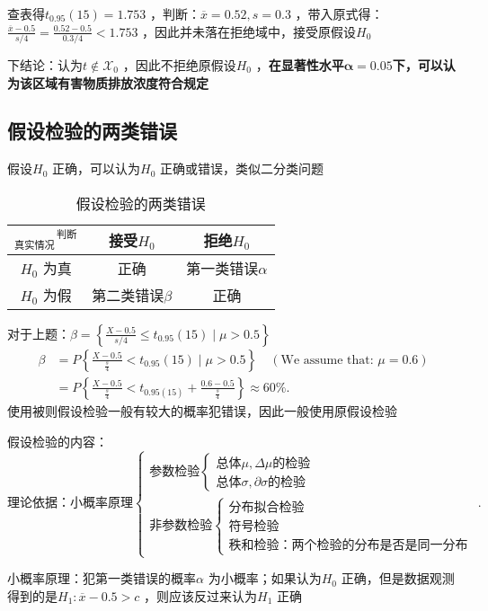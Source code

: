 查表得$t_{0.95}\left( 15 \right)=1.753$ ，判断：$\overline{x}=0.52,s=0.3$ ，带入原式得：$\frac{\overline{x}-0.5}{s /4}=\frac{0.52-0.5}{0.3 /4}<1.753$ ，因此并未落在拒绝域中，接受原假设$H_0$

下结论：认为$t\not\in \mathscr{X}_0$ ，因此不拒绝原假设$H_0$ ，\textbf{在显著性水平}$\bm{\alpha}=0.05$\textbf{下，可以认为该区域有害物质排放浓度符合规定}
\subsection{假设检验的两类错误}%
\label{sub:假设检验的两类错误}
假设$H_0$ 正确，可以认为$H_0$ 正确或错误，类似二分类问题
\begin{table}[htpb]
    \centering
    \caption{假设检验的两类错误}
    \label{tab:假设检验的两类错误}
    \begin{tabular}{|c|c|c|}
    \hline
    $_\text{真实情况}\hspace{1pt}^\text{判断}$ & 接受$H_0$ & 拒绝$H_0$ \\
    \hline
    $H_0$ 为真 & 正确 & 第一类错误$\alpha$ \\
    \hline
    $H_0$ 为假 & 第二类错误$\beta$ & 正确\\
    \hline
    \end{tabular}
\end{table}

对于上题：$\beta=\left\{ \frac{X-0.5}{s /4}\le t_{0.95}\left( 15 \right) \mid \mu>0.5 \right\}$
\begin{align*}
    \beta&=P\left\{ \frac{X-0.5}{\frac{s}{4}}<t_{0.95}\left( 15 \right) \mid \mu>0.5 \right\} \quad \left( \text{We assume that: } \mu=0.6\right) \\
         &= P\left\{ \frac{X-0.5}{\frac{s}{4}}<t_{0.95\left( 15 \right)}+\frac{0.6-0.5}{\frac{s}{4}} \right\} \approx 60\%
.\end{align*}
使用被则假设检验一般有较大的概率犯错误，因此一般使用原假设检验

假设检验的内容：
\[
    \text{理论依据：小概率原理}
    \begin{cases}
        \text{参数检验}\begin{cases}
            \text{总体}\mu,\Delta\mu \text{的检验}\\
            \text{总体}\sigma,\partial\sigma \text{的检验}
        \end{cases}\\
        \text{非参数检验}\begin{cases}
            \text{分布拟合检验}\\
            \text{符号检验}\\
            \text{秩和检验：两个检验的分布是否是同一分布}
        \end{cases}
    \end{cases}
.\]
\begin{notation}
小概率原理：犯第一类错误的概率$\alpha$ 为小概率；如果认为$H_0$ 正确，但是数据观测得到的是$H_1:\overline{x}-0.5>c$ ，则应该反过来认为$H_1$ 正确
\end{notation}
